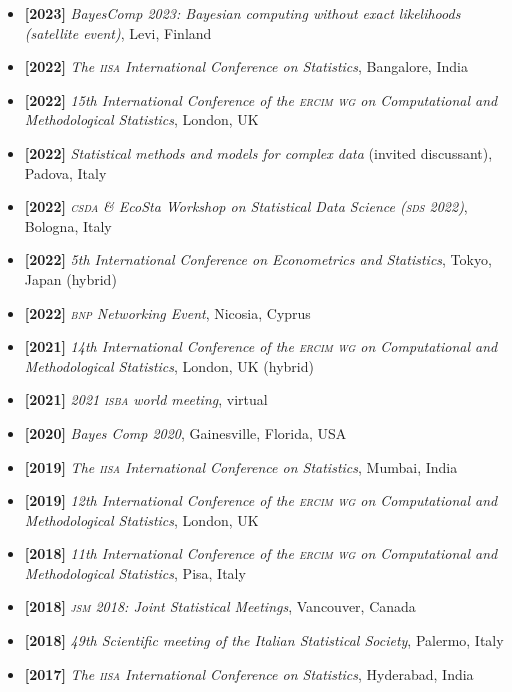 \documentclass[10pt]{article}
\newenvironment{outerlist}[1][\enskip\tiny\textbullet]%
        {\begin{itemize}[#1]}{\end{itemize}%
         \vspace{-.6\baselineskip}}
\newcommand{\blankline}{\quad\pagebreak[2]}
\begin{document}
\begin{outerlist}
\item[\textbf{[2023]}] \textsl{BayesComp 2023: Bayesian computing without exact likelihoods (satellite event)}, Levi, Finland
\item[\textbf{[2022]}] \textsl{The \textsc{iisa} International Conference on Statistics}, Bangalore, India
\item[\textbf{[2022]}] \textsl{15th International Conference of the \textsc{ercim wg} on Computational and Methodological Statistics}, London, UK
\item[\textbf{[2022]}] \textsl{Statistical methods and models for complex data} (invited discussant), Padova, Italy
\item[\textbf{[2022]}] \textsl{\textsc{csda} \& EcoSta Workshop on Statistical Data Science (\textsc{sds} 2022)}, Bologna, Italy
\item[\textbf{[2022]}] \textsl{5th International Conference on Econometrics and Statistics}, Tokyo, Japan (hybrid)
\item[\textbf{[2022]}] \textsl{\textsc{bnp} Networking Event}, Nicosia, Cyprus
\item[\textbf{[2021]}] \textsl{14th International Conference of the \textsc{ercim wg} on Computational and Methodological Statistics}, London, UK (hybrid)
\item[\textbf{[2021]}] \textsl{2021 \textsc{isba} world meeting}, virtual
\item[\textbf{[2020]}] \textsl{Bayes Comp 2020}, Gainesville, Florida, USA
\item[\textbf{[2019]}] \textsl{The \textsc{iisa} International Conference on Statistics}, Mumbai, India
\item[\textbf{[2019]}] \textsl{12th International Conference of the \textsc{ercim wg} on Computational and Methodological Statistics}, London, UK
\item[\textbf{[2018]}] \textsl{11th International Conference of the \textsc{ercim wg} on Computational and Methodological Statistics}, Pisa, Italy
\item[\textbf{[2018]}] \textsl{\textsc{jsm} 2018: Joint Statistical Meetings}, Vancouver, Canada
\item[\textbf{[2018]}] \textsl{49th Scientific meeting of the Italian Statistical Society}, Palermo, Italy
\item[\textbf{[2017]}] \textsl{The \textsc{iisa} International Conference on Statistics}, Hyderabad, India 
\end{outerlist}
\blankline
\end{document}
